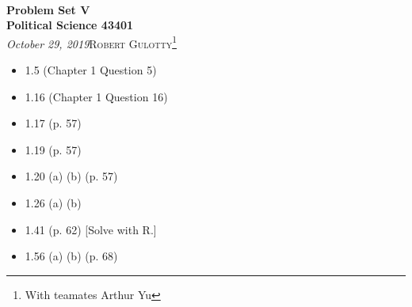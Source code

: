\documentclass[12pt]{article}
\begin{document}
{\noindent\Huge\bf  \\[0.5\baselineskip] {\selectfont  Problem Set V}         }\\[2\baselineskip] %
{ {\bf {}\selectfont Political Science 43401}\\ {\textit{\selectfont     October 29, 2019}}}\hfill   {\large \textsc{Robert Gulotty}\footnote{With teamates Arthur Yu}} %
\\[1.4\baselineskip] 





\begin{itemize}
\item[] 1.5 (Chapter 1 Question 5)
\item[]  1.16 (Chapter 1 Question 16)
\item[]  1.17 (p. 57)
\item[] 1.19 (p. 57)
\item[] 1.20 (a) (b) (p. 57) 
\item[] 1.26 (a) (b)
\item[] 1.41 (p. 62) [Solve with R.]
\item[] 1.56 (a) (b) (p. 68)
\end{itemize}
\end{document}
